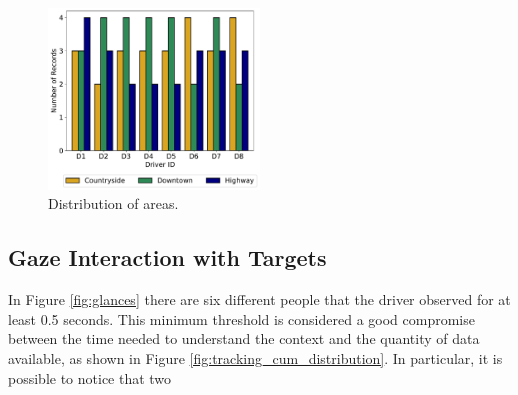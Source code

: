 \begin{figure}
    \centering
    \includegraphics[width=0.5\textwidth]{images/dreyeve/area_distrib.pdf}
    \caption{Distribution of areas.}
    \label{fig:plot3}
\end{figure}

\subsection{Gaze Interaction with Targets}
In Figure \ref{fig:glances} there are six different people that the driver 
observed for at least 0.5 seconds. This minimum threshold is considered a good 
compromise between the time needed to understand the context and the quantity 
of data available, as shown in Figure \ref{fig:tracking_cum_distribution}.
In particular, it is possible to notice that two 


